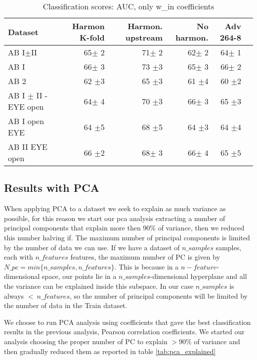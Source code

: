 \documentclass[a4paper,11pt]{article}
\begin{document}
\begin{table}[!htp]\centering
\scriptsize
\begin{tabular}{lrrrrr}\toprule
Dataset &Harmon K-fold &Harmon. upstream &No harmon. &Adv 264-8 \\\midrule
AB I$\pm$II &65$\pm$ 2 &71$\pm$ 2 &62$\pm$ 2 &64$\pm$ 1 \\
AB I &66$\pm$ 3 &73 $\pm$3 &65$\pm$ 3 &66$\pm$ 2 \\
AB 2 &62 $\pm$3 &65 $\pm$3 &61 $\pm$4 &60 $\pm$2 \\
AB I $\pm$ II - EYE open &64$\pm$ 4 &70 $\pm$3 &66$\pm$ 3 &65 $\pm$3 \\
AB I open EYE &64 $\pm$5 &68 $\pm$5 &64 $\pm$3 &64 $\pm$4 \\
AB II EYE open &66 $\pm$2 &68$\pm$ 3 &66$\pm$ 4 &65 $\pm$5 \\
\bottomrule
\end{tabular}
\caption{Classification scores: AUC, only w\_in coefficients}\label{tab:classification_win}

\end{table}


\newpage

\subsection{Results with PCA}

When applying PCA to a dataset we seek to explain as much variance as possible, for this reason we start our pca analysis extracting a number of principal components that explain more then 90$\%$ of variance, then we reduced this number halving if.
The maximum number of principal components is limited by the number of data we can use. If we have a dataset of $n\_samples$ samples, each with $n\_features$ features, the maximum number of PC is given by $N\_pc = min\{n\_samples, n\_features\}$.
This is because in a $n-feature$-dimensional space, our points lie in a $n\_samples$-dimensional hyperplane and all the variance can be explained inside this subspace.
In our case $n\_samples$ is always $< \ n\_features$, so the number of principal components will be limited by the number of data in the Train dataset.

We choose to run PCA analysis using coefficients that gave the best classification results in the previous analysis, Pearson correlation coefficients.
We started our analysis choosing the proper number of PC to explain $> 90\%$ of variance and then gradually reduced them as reported in table \ref{tab:pca_explained}
\end{document}
